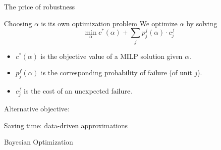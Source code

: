 \documentclass[aspectratio=169,slides]{beamer}
\begin{document}
\begin{frame}{The price of robustness}
    \centering
    
\end{frame}


\begin{frame}{Choosing $\alpha$ is its own optimization problem }
    We optimize $\alpha$ by solving
    \begin{equation*}
    \min_{\alpha} c^*(\alpha) + \sum_{j} p^f_{j}(\alpha)\cdot c_{j}^f
    \end{equation*}
    \begin{itemize}
        \item $c^*(\alpha)$ is the objective value of a MILP solution given $\alpha$.
        \item $p^f_j(\alpha)$ is the corresponding probability of failure (of
            unit $j$).
        \item $c_j^f$ is the cost of an unexpected failure.
    \end{itemize}
    Alternative objective: \citet{Li2015_2}
\end{frame}


\begin{frame}{Saving time: data-driven approximations}
\end{frame}


\begin{frame}{Bayesian Optimization}
\end{frame}
\end{document}
